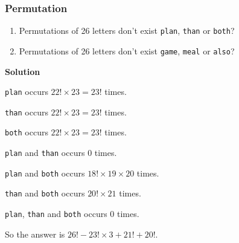 \documentclass[10pt, compress]{beamer}
\begin{document}
\begin{frame}[fragile]
\frametitle{Permutation}
\begin{enumerate}
	\item Permutations of 26 letters don\textquoteright t exist \texttt{plan}, \texttt{than} or \texttt{both}?
	\item Permutations of 26 letters don\textquoteright t exist \texttt{game}, \texttt{meal} or \texttt{also}?
\end{enumerate}
\textbf{Solution}

\texttt{plan} occurs $22! \times 23 = 23!$ times.

\texttt{than} occurs $22! \times 23 = 23!$ times.

\texttt{both} occurs $22! \times 23 = 23!$ times.

\texttt{plan} and \texttt{than} occurs $0$ times.

\texttt{plan} and \texttt{both} occurs $18! \times 19 \times 20$ times.

\texttt{than} and \texttt{both} occurs $20! \times 21$ times.

\texttt{plan}, \texttt{than} and \texttt{both} occurs $0$ times.

So the answer is $26! - 23! \times 3 + 21! + 20!$.

\end{frame}
\end{document}
